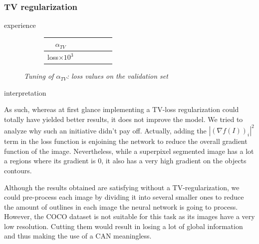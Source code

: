 \documentclass{article}
\begin{document}
        \subsubsection{TV regularization}
            experience \cite{todo}

            \begin{figure}[!ht]
                \begin{subfigure}{.49\linewidth}
                    \centering
                    \begin{tabular}{|c|c|c|c|c|c|}
                        \hline
                        $\alpha_{TV}$ &   &   &   &   &   \\
                        \hline \hline
                        loss$\times 10^3$ &   &   &   &   &  \\
                        \hline
                    \end{tabular}
                \end{subfigure}
                \begin{subfigure}{.49\linewidth}
                    \centering
                \end{subfigure}
                \caption{\textit{Tuning of $\alpha_{TV}$: loss values on the validation set}}
            \end{figure}
            \par
            interpretation \cite{todo}
            \par
            As such, whereas at first glance implementing a TV-loss regularization could totally have yielded better results, it does not improve the model. We tried to analyze why such an initiative didn't pay off. Actually, adding the $|(\nabla f(I))_i|^2$ term in the loss function is enjoining the network to reduce the overall gradient function of the image. Nevertheless, while a superpixel segmented image has a lot a regions where its gradient is 0, it also has a very high gradient on the objects contours.
            \par
            Although the results obtained are satisfying without a TV-regularization, we could pre-process each image by dividing it into several smaller ones to reduce the amount of outlines in each image the neural network is going to process. However, the COCO dataset is not suitable for this task as its images have a very low resolution. Cutting them would result in losing a lot of global information and thus making the use of a CAN meaningless.
\end{document}
